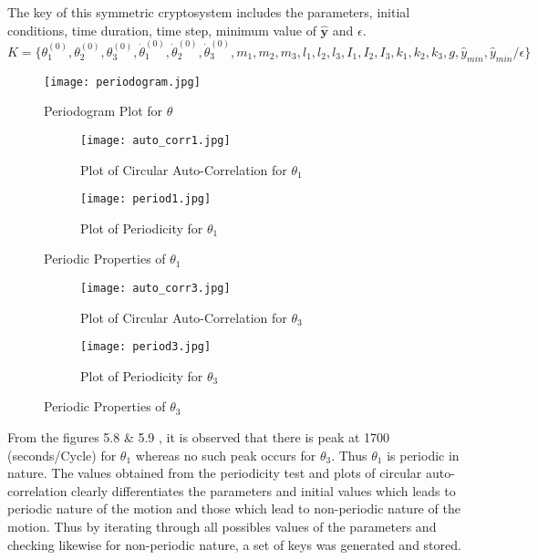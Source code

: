 The key of this symmetric cryptosystem includes the parameters, initial conditions, time duration, time step, minimum value of $\hat{\textbf{y}}$ and $\epsilon$.\\
$K=\{\theta^{(0)}_{1},\theta^{(0)}_{2},\theta^{(0)}_{3},\dot{\theta}^{(0)}_{1},\dot{\theta}^{(0)}_{2},\dot{\theta}^{(0)}_{3}, m_{1},m_{2},m_{3}, l_{1},l_{2},l_{3}, I_{1},I_{2},I_{3}, k_{1},k_{2},k_{3}, g, \hat{y}_{min}, \hat{y}_{min}/\epsilon \}$
\begin{figure}[H]
\centering
\texttt{[image: periodogram.jpg]}
\caption{Periodogram Plot for ${\theta}$}\label{fig:periodogram}
\end{figure}


\begin{figure}[H]
\begin{subfigure}{0.5\textwidth}
\texttt{[image: auto\_corr1.jpg]}
\caption{Plot of Circular Auto-Correlation for ${\theta_{1}}$}\label{fig:cir_auto1}
\end{subfigure}
\begin{subfigure}{0.5\textwidth}
\texttt{[image: period1.jpg]}
\caption{Plot of Periodicity for ${\theta_{1}}$}\label{fig:period1}
\end{subfigure}
\caption{Periodic Properties of ${\theta_{1}}$}\label{fig:image4}
\end{figure}

\begin{figure}[H]
\begin{subfigure}{0.5\textwidth}
\texttt{[image: auto\_corr3.jpg]}
\caption{Plot of Circular Auto-Correlation for ${\theta_{3}}$}\label{fig:cir_auto3}
\end{subfigure}
\begin{subfigure}{0.5\textwidth}
\texttt{[image: period3.jpg]}
\caption{Plot of Periodicity for ${\theta_{3}}$}\label{fig:period3}
\end{subfigure}
\caption{Periodic Properties of ${\theta_{3}}$}\label{fig:image5}
\end{figure}

From the figures 5.8 \& 5.9 , it is observed that there is peak at 1700 (seconds/Cycle) for $\theta_{1}$ whereas no such peak occurs for $\theta_{3}$. Thus $\theta_{1}$ is periodic in nature. The values obtained from the periodicity test and plots of circular auto-correlation clearly differentiates the parameters and initial values which leads to periodic nature of the motion and those which lead to non-periodic nature of the motion. Thus by iterating through all possibles values of the parameters and checking likewise for non-periodic nature, a set of keys was generated and stored. 


